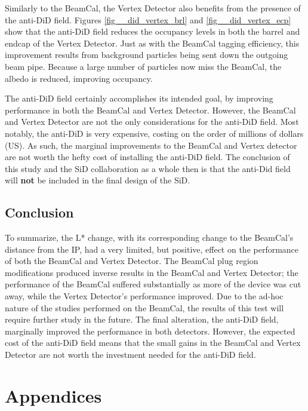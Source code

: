 \documentclass{report}
\begin{document}
                Similarly to the BeamCal, the Vertex Detector also benefits from the presence of the anti-DiD field. Figures \ref{fig__did_vertex_brl} and \ref{fig__did_vertex_ecp} show that the anti-DiD field reduces the occupancy levels in both the barrel and endcap of the Vertex Detector. Just as with the BeamCal tagging efficiency, this improvement results from background particles being sent down the outgoing beam pipe. Because a large number of particles now miss the BeamCal, the albedo is reduced, improving occupancy.

                The anti-DiD field certainly accomplishes its intended goal, by improving performance in both the BeamCal and Vertex Detector. However, the BeamCal and Vertex Detector are not the only considerations for the anti-DiD field. Most notably, the anti-DiD is very expensive, costing on the order of millions of dollars (US). As such, the marginal improvements to the BeamCal and Vertex detector are not worth the hefty cost of installing the anti-DiD field. The conclusion of this study and the SiD collaboration as a whole then is that the anti-Did field will \textbf{not} be included in the final design of the SiD.


        \section{Conclusion}
            To summarize, the L* change, with its corresponding change to the BeamCal's distance from the IP, had a very limited, but positive, effect on the performance of both the BeamCal and Vertex Detector. The BeamCal plug region modifications produced inverse results in the BeamCal and Vertex Detector; the performance of the BeamCal suffered substantially as more of the device was cut away, while the Vertex Detector's performance improved. Due to the ad-hoc nature of the studies performed on the BeamCal, the results of this test will require further study in the future. The final alteration, the anti-DiD field, marginally improved the performance in both detectors. However, the expected cost of the anti-DiD field means that the small gains in the BeamCal and Vertex Detector are not worth the investment needed for the anti-DiD field.





    \chapter{Appendices}
\end{document}
